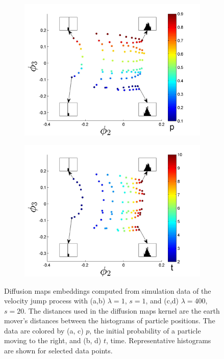 \documentclass[prl, reprint, final, showkeys]{revtex4-1}
\begin{document}
\begin{figure}[t]
\begin{subfigure}{0.45\columnwidth}
\caption{}
\label{subfig:small_lambda_t}
\end{subfigure}
\begin{subfigure}{0.45\columnwidth}
\includegraphics[width=\textwidth]{EMD_withhist_p_400}
\caption{}
\label{subfig:large_lambda_p}
\end{subfigure}
\begin{subfigure}{0.45\columnwidth}
\includegraphics[width=\textwidth]{EMD_withhist_t_400}
\caption{}
\label{subfig:large_lambda_t}
\end{subfigure}
\caption{Diffusion maps embeddings computed from simulation data of the velocity jump process with (a,b) $\lambda=1$, $s=1$, and (c,d) $\lambda=400$, $s=20$. The distances used in the diffusion maps kernel are the earth mover's distances between the histograms of particle positions. The data are colored by (a, c) $p$, the initial probability of a particle moving to the right, and (b, d) $t$, time. Representative histograms are shown for selected data points.}
\label{fig:dmaps_embed_emd}
\end{figure}
\end{document}
